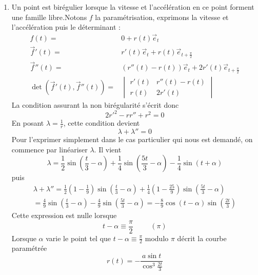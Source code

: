 \begin{enumerate}
\item Un point est birégulier lorsque la vitesse et l'accélération en ce point forment une famille libre.\newline Notons $f$ la paramétrisation, exprimons la vitesse et l'accélération puis le déterminant :
\begin{align*}  
 f(t) =& 0 + r(t) \overrightarrow e_t \\
 \overrightarrow f'(t) =& r'(t) \overrightarrow e_t +r(t) \overrightarrow e_{t+\frac{\pi}{2}} \\
\overrightarrow f''(t) =& (r''(t) -r(t))\overrightarrow e_t + 2r'(t) \overrightarrow e_{t+\frac{\pi}{2}} \\
\det(\overrightarrow f'(t),\overrightarrow f''(t)) =&
\begin{vmatrix}
 r'(t) & r''(t) -r(t)  \\
 r(t) & 2r'(t)
\end{vmatrix}
\end{align*}
La condition assurant la non bir{\'e}gularit{\'e} s'{\'e}crit donc
\begin{displaymath}
 2r'^2 -rr''+r^2=0
\end{displaymath}
En posant $\lambda =\frac{1}{r}$, cette condition devient 
\begin{displaymath}
\lambda +\lambda ''=0 
\end{displaymath}
Pour l'exprimer simplement dans le cas particulier qui nous est demandé, on commence par lin{\'e}ariser $\lambda $. Il vient
\begin{displaymath}
\lambda  = \frac{1}{2}\sin (\frac{t}{3}-\alpha ) 
+ \frac{1}{4}\sin (\frac{5t}{3}-\alpha )
-\frac{1}{4}\sin (t+\alpha )
\end{displaymath}
puis
\begin{multline*}
\lambda +\lambda'' = \frac{1}{2}(1-\frac{1}{9})\sin (\frac{t}{3}-\alpha )+\frac{1}{4}(1-\frac{25}{9})\sin (\frac{5t}{3}-\alpha ) \\
 = \frac{4}{9}\sin (\frac{t}{3}-\alpha )-\frac{4}{9}\sin (\frac{5t}{3}-\alpha ) 
 = -\frac{8}{9}\cos (t-\alpha )\sin (\frac{2t}{3})
\end{multline*}
Cette expression est nulle lorsque 
\begin{displaymath}
t-\alpha \equiv \frac{\pi }{2} \hspace{1cm} (\pi)  
\end{displaymath}
Lorsque $\alpha $ varie le point tel que $t-\alpha \equiv \frac{\pi }{2}$ modulo $\pi$ d{\'e}crit la courbe param{\'e}tr{\'e}e
\[
r(t)=-\frac{a\sin t}{\cos ^{3}\frac{2t}{3}}
\]
\end{enumerate}
